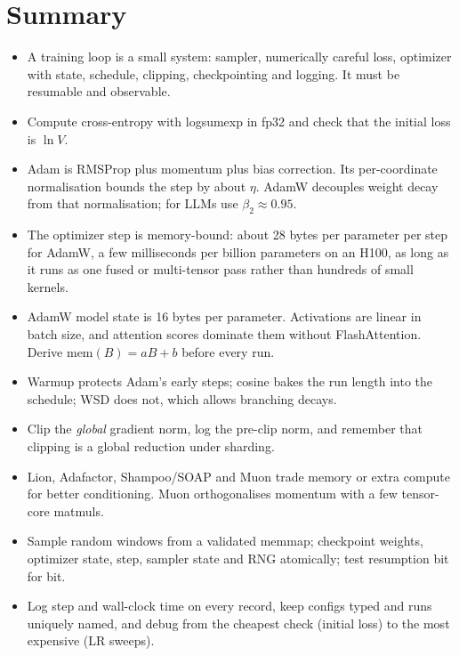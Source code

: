 \section{Summary}\label{sec:optim:summary}
\begin{itemize}
  \item A training loop is a small system: sampler, numerically careful loss, optimizer with
        state, schedule, clipping, checkpointing and logging. It must be resumable and observable.
  \item Compute cross-entropy with logsumexp in fp32 and check that the initial loss is $\ln V$.
  \item Adam is RMSProp plus momentum plus bias correction. Its per-coordinate normalisation
        bounds the step by about $\eta$. AdamW decouples weight decay from that normalisation; for
        LLMs use $\beta_2\approx0.95$.
  \item The optimizer step is memory-bound: about 28 bytes per parameter per step for AdamW, a few
        milliseconds per billion parameters on an H100, as long as it runs as one fused or multi-tensor
        pass rather than hundreds of small kernels.
  \item AdamW model state is 16 bytes per parameter. Activations are linear in batch size, and attention
        scores dominate them without FlashAttention. Derive $\text{mem}(B)=aB+b$ before every run.
  \item Warmup protects Adam's early steps; cosine bakes the run length into the schedule; WSD
        does not, which allows branching decays.
  \item Clip the \emph{global} gradient norm, log the pre-clip norm, and remember that clipping is a
        global reduction under sharding.
  \item Lion, Adafactor, Shampoo/SOAP and Muon trade memory or extra compute for better
        conditioning. Muon orthogonalises momentum with a few tensor-core matmuls.
  \item Sample random windows from a validated  memmap; checkpoint weights,
        optimizer state, step, sampler state and RNG atomically; test resumption bit for bit.
  \item Log step and wall-clock time on every record, keep configs typed and runs uniquely named,
        and debug from the cheapest check (initial loss) to the most expensive (LR sweeps).
\end{itemize}

